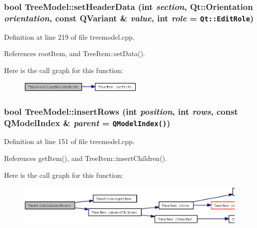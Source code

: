 \subsubsection{\setlength{\rightskip}{0pt plus 5cm}bool Tree\-Model::set\-Header\-Data (int {\em section}, Qt::Orientation {\em orientation}, const QVariant \& {\em value}, int {\em role} = {\tt Qt::EditRole})}\label{classTreeModel_8d42cbbd50936e26241fb6a71ee9fb84}




Definition at line 219 of file treemodel.cpp.

References root\-Item, and Tree\-Item::set\-Data().

Here is the call graph for this function:\begin{figure}[H]
\begin{center}
\leavevmode
\includegraphics[width=170pt]{classTreeModel_8d42cbbd50936e26241fb6a71ee9fb84_cgraph}
\end{center}
\end{figure}
\subsubsection{\setlength{\rightskip}{0pt plus 5cm}bool Tree\-Model::insert\-Rows (int {\em position}, int {\em rows}, const QModel\-Index \& {\em parent} = {\tt QModelIndex()})}\label{classTreeModel_56f31919a9eb68ae229afea2257bfc35}




Definition at line 151 of file treemodel.cpp.

References get\-Item(), and Tree\-Item::insert\-Children().

Here is the call graph for this function:\begin{figure}[H]
\begin{center}
\leavevmode
\includegraphics[width=366pt]{classTreeModel_56f31919a9eb68ae229afea2257bfc35_cgraph}
\end{center}
\end{figure}
